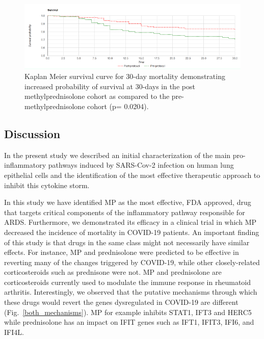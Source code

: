 \documentclass[Minh_PhD_thesis.tex]{subfiles}
\begin{document}
\begin{figure}
\centering
	\includegraphics[width=1\linewidth]{../Figures/Survival_methylprednisolone.png}
        \caption{Kaplan Meier survival curve for 30-day mortality demonstrating increased probability of survival at 30-days in the post methylprednisolone cohort as compared to the pre-methylprednisolone cohort (p= 0.0204).  }
        \label{survival}
\end{figure}



\subsection{Discussion}

In the present study we described an initial characterization of the main pro-inflammatory pathways induced by SARS-Cov-2 infection on human lung epithelial cells and the identification of the most effective therapeutic approach to inhibit this cytokine storm.


In this study we have identified MP as the most effective, FDA approved, drug that targets critical components of the inflammatory pathway responsible for ARDS.  Furthermore, we demonstrated its efficacy  in a clinical trial in which MP decreased the incidence of mortality in COVID-19 patients. An important finding of this study is that drugs in the same class might not necessarily have similar effects. For instance, MP and prednisolone were predicted to be effective in reverting many of the changes triggered by COVID-19, while other closely-related corticosteroids such as prednisone were not. MP and prednisolone are corticosteroids currently used to modulate the immune response in rheumatoid arthritis. Interestingly, we observed that the putative mechanisms through which these drugs would revert the genes dysregulated in COVID-19 are different (Fig.~\ref{both_mechanisms}). MP for example inhibits STAT1, IFT3 and HERC5 while prednisolone has an impact on IFIT genes such as IFT1, IFIT3, IFI6, and IFI4L.
\end{document}
